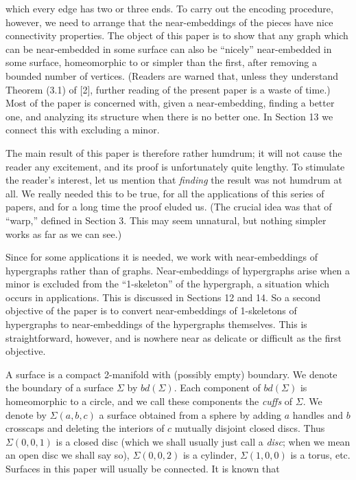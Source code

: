 \noindent which every edge has two or three ends. To carry out the encoding procedure, however, we need to arrange that the near-embeddings of the pieces have nice connectivity properties. The object of this paper is to show that any graph which can be near-embedded in some surface can also be ``nicely'' near-embedded in some surface, homeomorphic to or simpler than the first, after removing a bounded number of vertices. (Readers are warned that, unless they understand Theorem (3.1) of [2], further reading of the present paper is a waste of time.) Most of the paper is concerned with, given a near-embedding, finding a better one, and analyzing its structure when there is no better one. In Section 13 we connect this with excluding a minor.

The main result of this paper is therefore rather humdrum; it will not cause the reader any excitement, and its proof is unfortunately quite lengthy. To stimulate the reader's interest, let us mention that \textit{finding} the result was not humdrum at all. We really needed this to be true, for all the applications of this series of papers, and for a long time the proof eluded us. (The crucial idea was that of ``warp,'' defined in Section 3. This may seem unnatural, but nothing simpler works as far as we can see.)

Since for some applications it is needed, we work with near-embeddings of hypergraphs rather than of graphs. Near-embeddings of hypergraphs arise when a minor is excluded from the ``1-skeleton'' of the hypergraph, a situation which occurs in applications. This is discussed in Sections 12 and 14. So a second objective of the paper is to convert near-embeddings of 1-skeletons of hypergraphs to near-embeddings of the hypergraphs themselves. This is straightforward, however, and is nowhere near as delicate or difficult as the first objective.

A surface is a compact 2-manifold with (possibly empty) boundary. We denote the boundary of a surface $\Sigma$ by $bd(\Sigma)$. Each component of $bd(\Sigma)$ is homeomorphic to a circle, and we call these components the \textit{cuffs} of $\Sigma$. We denote by $\Sigma(a, b, c)$ a surface obtained from a sphere by adding $a$ handles and $b$ crosscaps and deleting the interiors of $c$ mutually disjoint closed discs. Thus $\Sigma(0, 0, 1)$ is a closed disc (which we shall usually just call a \textit{disc}; when we mean an open disc we shall say so), $\Sigma(0, 0, 2)$ is a cylinder, $\Sigma(1, 0, 0)$ is a torus, etc. Surfaces in this paper will usually be connected. It is known that

